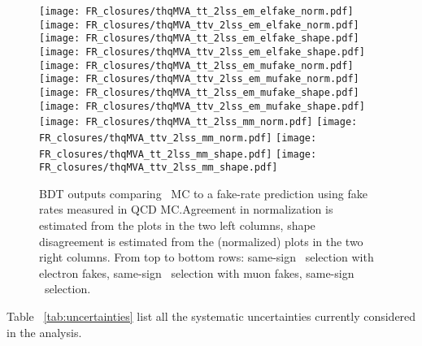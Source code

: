 \begin{figure}[htb]
 \centering
 \texttt{[image: FR\_closures/thqMVA\_tt\_2lss\_em\_elfake\_norm.pdf]} 
 \texttt{[image: FR\_closures/thqMVA\_ttv\_2lss\_em\_elfake\_norm.pdf]} 
 \texttt{[image: FR\_closures/thqMVA\_tt\_2lss\_em\_elfake\_shape.pdf]} 
 \texttt{[image: FR\_closures/thqMVA\_ttv\_2lss\_em\_elfake\_shape.pdf]}\\ 
 \texttt{[image: FR\_closures/thqMVA\_tt\_2lss\_em\_mufake\_norm.pdf]} 
 \texttt{[image: FR\_closures/thqMVA\_ttv\_2lss\_em\_mufake\_norm.pdf]} 
 \texttt{[image: FR\_closures/thqMVA\_tt\_2lss\_em\_mufake\_shape.pdf]} 
 \texttt{[image: FR\_closures/thqMVA\_ttv\_2lss\_em\_mufake\_shape.pdf]}\\ 
 \texttt{[image: FR\_closures/thqMVA\_tt\_2lss\_mm\_norm.pdf]} 
 \texttt{[image: FR\_closures/thqMVA\_ttv\_2lss\_mm\_norm.pdf]} 
 \texttt{[image: FR\_closures/thqMVA\_tt\_2lss\_mm\_shape.pdf]} 
 \texttt{[image: FR\_closures/thqMVA\_ttv\_2lss\_mm\_shape.pdf]} \\
\caption[Fake rates closure test.]{BDT outputs comparing \ttbar\ MC to a fake-rate prediction using fake rates measured in QCD MC.\@ Agreement in normalization is estimated from the plots in the two left columns, shape disagreement is estimated from the  (normalized) plots in the two right columns. From top to bottom rows: same-sign \emu\ selection with electron fakes, same-sign \emu\ selection with muon fakes, same-sign \mumu\ selection.} 
\label{fig:frclosure_2lss_ee}
\end{figure} 

Table ~\ref{tab:uncertainties} list all the systematic uncertainties currently considered in the analysis.

